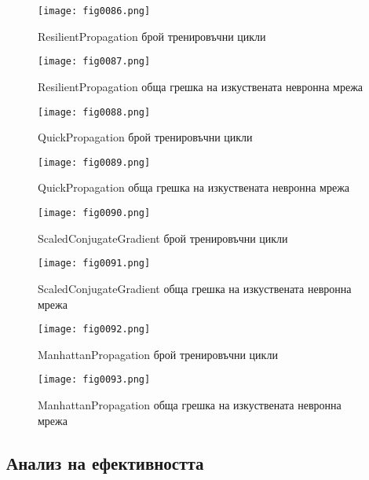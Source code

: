 \begin{figure}[H]
  \centering
  \texttt{[image: fig0086.png]}
  \caption{ResilientPropagation брой тренировъчни цикли}
\label{fig0086}
\end{figure}

\begin{figure}[H]
  \centering
  \texttt{[image: fig0087.png]}
  \caption{ResilientPropagation обща грешка на изкуствената невронна мрежа}
\label{fig0087}
\end{figure}

\begin{figure}[H]
  \centering
  \texttt{[image: fig0088.png]}
  \caption{QuickPropagation брой тренировъчни цикли}
\label{fig0088}
\end{figure}

\begin{figure}[H]
  \centering
  \texttt{[image: fig0089.png]}
  \caption{QuickPropagation обща грешка на изкуствената невронна мрежа}
\label{fig0089}
\end{figure}

\begin{figure}[H]
  \centering
  \texttt{[image: fig0090.png]}
  \caption{ScaledConjugateGradient брой тренировъчни цикли}
\label{fig0090}
\end{figure}

\begin{figure}[H]
  \centering
  \texttt{[image: fig0091.png]}
  \caption{ScaledConjugateGradient обща грешка на изкуствената невронна мрежа}
\label{fig0091}
\end{figure}

\begin{figure}[H]
  \centering
  \texttt{[image: fig0092.png]}
  \caption{ManhattanPropagation брой тренировъчни цикли}
\label{fig0092}
\end{figure}

\begin{figure}[H]
  \centering
  \texttt{[image: fig0093.png]}
  \caption{ManhattanPropagation обща грешка на изкуствената невронна мрежа}
\label{fig0093}
\end{figure}

\subsection{Анализ на ефективността}

